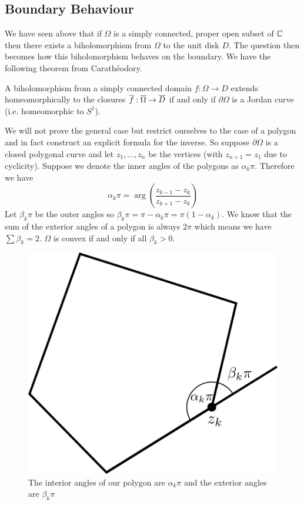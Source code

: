 \subsection{Boundary Behaviour}
We have seen above that if $\Omega$ is a simply connected, proper open subset of $\mathbb{C}$ then there exists a biholomorphism from $\Omega$ to the unit disk $D$. The question then becomes how this biholomorphism behaves on the boundary. We have the following theorem from Carathéodory.
\begin{theorem}
    A biholomorphism from a simply connected domain $f: \Omega \to D$ extends homeomorphically to the closures $\overline{f}: \overline{\Omega} \to \overline{D}$ if and only if $\partial \Omega$ is a Jordan curve (i.e. homeomorphic to $S^1$).
\end{theorem}

We will not prove the general case but restrict ourselves to the case of a polygon and in fact construct an explicit formula for the inverse. So suppose $\partial \Omega$ is a closed polygonal curve and let $z_1, \dots, z_n$ be the vertices (with $z_{n + 1} = z_1$ due to cyclicity). Suppose we denote the inner angles of the polygons as $\alpha_k \pi$. Therefore we have 
$$\alpha_k \pi = \arg \left( \frac{z_{k - 1} - z_k}{z_{k + 1} - z_k} \right)$$
Let $\beta_k \pi$ be the outer angles so $\beta_k \pi = \pi - \alpha_k \pi = \pi(1 - \alpha_k)$. We know that the sum of the exterior angles of a polygon is always $2\pi$ which means we have $\sum \beta_k = 2$. $\Omega$ is convex if and only if all $\beta_k > 0$.

\begin{figure}[ht]
    \centering
    \includegraphics[scale=0.9]{Images/riem_map_poly_diag.png}
    \caption{The interior angles of our polygon are $\alpha_k \pi$ and the exterior angles are $\beta_k \pi$}
    \label{fig:riem-map-poly-diag}
\end{figure}

